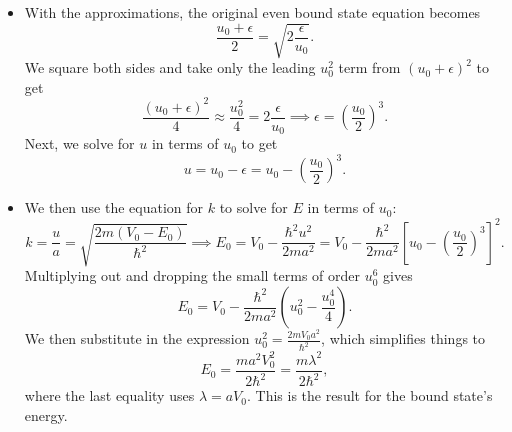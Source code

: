 \documentclass[11pt, a4paper]{article}
\begin{document}
\begin{itemize}
	
	\item With the approximations, the original even bound state equation becomes
	\begin{equation*}
		\frac{u_{0} + \epsilon}{2} = \sqrt{2\frac{\epsilon}{u_{0}}}.
	\end{equation*}
	We square both sides and take only the leading $ u_{0}^{2} $ term from $ (u_{0} + \epsilon)^{2} $ to get
	\begin{equation*}
		\frac{(u_{0} + \epsilon)^{2}}{4} \approx \frac{u_{0}^{2}}{4} = 2 \frac{\epsilon}{u_{0}} \implies \epsilon = \left(\frac{u_{0}}{2}\right)^{3}.
	\end{equation*}
	Next, we solve for $ u $ in terms of $ u_{0} $ to get
	\begin{equation*}
		u = u_{0} - \epsilon = u_{0} - \left(\frac{u_{0}}{2}\right)^{3}.
	\end{equation*}
	
	\item We then use the equation for $ k $ to solve for $ E $ in terms of $ u_{0} $:
	\begin{equation*}
		k = \frac{u}{a} = \sqrt{\frac{2m(V_{0}- E_{0})}{\hbar^{2}}} \implies E_{0} = V_{0} - \frac{\hbar^{2}u^{2}}{2ma^{2}} = V_{0} - \frac{\hbar^{2}}{2ma^{2}}\left[u_{0} - \left(\frac{u_{0}}{2}\right)^{3}\right]^{2}.
	\end{equation*}
	Multiplying out and dropping the small terms of order $ u_{0}^{6} $ gives
	\begin{equation*}
		E_{0} = V_{0} - \frac{\hbar^{2}}{2ma^{2}}\left(u_{0}^{2} - \frac{u_{0}^{4}}{4}\right).
	\end{equation*}
	We then substitute in the expression $ u_{0}^{2} = \frac{2mV_{0}a^{2}}{\hbar^{2}} $, which simplifies things to
	\begin{equation*}
		E_{0} = \frac{ma^{2}V_{0}^{2}}{2\hbar^{2}} = \frac{m\lambda^{2}}{2\hbar^{2}},
	\end{equation*}
	where the last equality uses $ \lambda = a V_{0} $. This is the result for the bound state's energy. 
	

\end{itemize}
\end{document}
